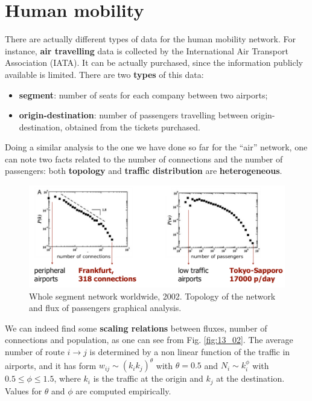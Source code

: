 \documentclass[../main/main.tex]{subfiles}
\begin{document}
\section{Human mobility}
\label{section:human_mobility}

There are actually different types of data for the human mobility network. For instance, \textbf{air travelling} data is collected by the International Air Transport Association (IATA). It can be actually purchased, since the information publicly available is limited. There are two \textbf{types} of this data:
 \begin{itemize}
     \item \textbf{segment}: number of seats for each company between two airports;
     \item \textbf{origin-destination}: number of passengers travelling between origin-destination, obtained from the tickets purchased.
 \end{itemize}
Doing a similar analysis to the one we have done so far for the “air” network, one can note two facts related to the number of connections and the number of passengers: both \textbf{topology} and \textbf{traffic distribution} are \textbf{heterogeneous}.

\begin{figure}[h!]
\centering
\includegraphics[width=1.0\textwidth]{../lessons/image/14/image01.png}
\caption{\label{fig:13_01} Whole segment network worldwide, 2002. Topology of the network and flux of passengers graphical analysis.}
\end{figure}

We can indeed find some \textbf{scaling relations} between fluxes, number of connections and population, as one can see from Fig. \ref{fig:13_02}. The average number of route $i \to j$ is determined by a non linear function of the traffic in airports, and it has form $w_{ij} \sim (k_i k_j)^\theta$ with $\theta =0.5$ and $N_i \sim k_i^{\phi}$ with $ 0.5\le \phi\le 1.5$, where $k_i$ is the traffic at the origin and $k_j$ at the destination. Values for $\theta$ and $\phi$ are computed empirically.
\end{document}
